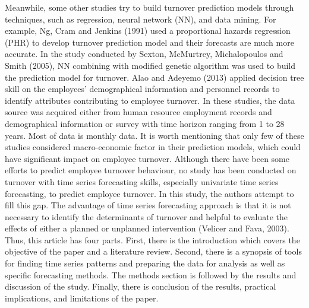 Meanwhile, some other studies try to build turnover prediction models through techniques, such as regression, neural network (NN), and data mining. For example, Ng, Cram and Jenkins (1991) used a proportional hazards regression (PHR) to develop turnover prediction model and their forecasts are much more accurate. In the study conducted by Sexton, McMurtrey, Michalopoulos and Smith (2005), NN combining with modified genetic algorithm was used to build the prediction model for turnover. Alao and Adeyemo (2013) applied decision tree skill on the employees’ demographical information and personnel records to identify attributes contributing to employee turnover.
In these studies, the data source was acquired either from human resource employment records and demographical information or survey with time horizon ranging from 1 to 28 years. Most of data is monthly data. It is worth mentioning that only few of these studies considered macro-economic factor in their prediction models, which could have significant impact on employee turnover.
Although there have been some efforts to predict employee turnover behaviour, no study has been conducted on turnover with time series forecasting skills, especially univariate time series forecasting, to predict employee turnover. In this study, the authors attempt to fill this gap. The advantage of time series forecasting approach is that it is not necessary to identify the determinants of turnover and helpful to evaluate the effects of either a planned or unplanned intervention (Velicer and Fava, 2003).  
Thus, this article has four parts. First, there is the introduction which covers the objective of the paper and a literature review. Second, there is a synopsis of tools for finding time series patterns and preparing the data for analysis as well as specific forecasting methods. The methods section is followed by the results and discussion of the study. Finally, there is conclusion of the results, practical implications, and limitations of the paper. 

